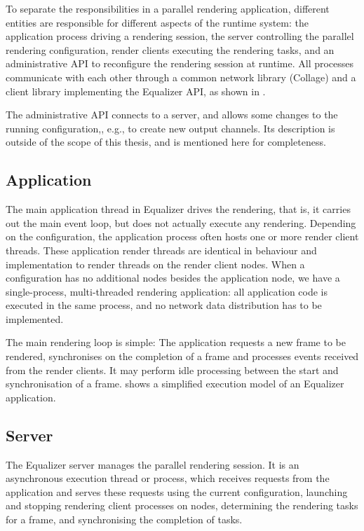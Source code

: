 To separate the responsibilities in a parallel rendering application, different
entities are responsible for different aspects of the runtime system: the
application process driving a rendering session, the server controlling the
parallel rendering configuration, render clients executing the rendering
tasks, and an administrative API to reconfigure the rendering session at
runtime. All processes communicate with each other through a common network
library (Collage) and a client library implementing the Equalizer API, as shown
in .

The administrative API connects to a server, and allows some changes to the
running configuration,, e.g., to create new output channels. Its description is
outside of the scope of this thesis, and is mentioned here for completeness.

\subsection{Application}

The main application thread in Equalizer drives the rendering, that is, it
carries out the main event loop, but does not actually execute any rendering.
Depending on the configuration, the application process often hosts one or more
render client threads. These application render threads are identical in
behaviour and implementation to render threads on the render client nodes. When
a configuration has no additional nodes besides the application node, we have a
single-process, multi-threaded rendering application: all application code is
executed in the same process, and no network data distribution has to be
implemented.

The main rendering loop is simple: The application requests a new frame
to be rendered, synchronises on the completion of a frame and processes events
received from the render clients. It may perform idle processing between the
start and synchronisation of a frame.  shows a simplified
execution model of an Equalizer application.


\subsection{Server}

The Equalizer server manages the parallel rendering session. It is an
asynchronous execution thread or process, which receives requests from the
application and serves these requests using the current configuration, launching
and stopping rendering client processes on nodes, determining the rendering
tasks for a frame, and synchronising the completion of tasks.

